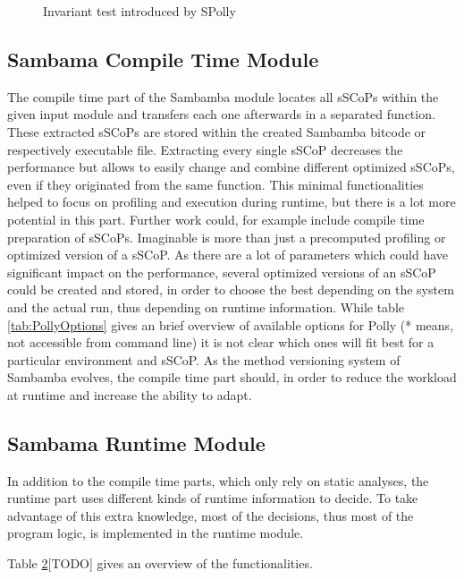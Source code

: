 \lstset{frame=none}
\begin{figure}[htbp]
  \centering
  \subfloat[source]{
  
  \label{lst:InvariantTestSRC}}
  \hspace*{5mm}
  \caption{Invariant test introduced by SPolly}
  \label{lst:InvariantTest}  
\end{figure}
\resetlst



\begin{shaded}
\section{Sambama Compile Time Module}
The compile time part of the Sambamba module locates all sSCoPs
within the given input module and transfers each one afterwards in a separated 
function. These extracted sSCoPs are stored within the created Sambamba 
bitcode or respectively executable file. Extracting every single sSCoP 
decreases the performance but allows to easily change and combine different 
optimized sSCoPs, even if they originated from the same function.   
This minimal functionalities helped to focus on profiling and
execution during runtime, but there is a lot more potential in this part.
Further work could, for example include compile time preparation of sSCoPs.
Imaginable is more than just a precomputed profiling or optimized version of
a sSCoP. As there are a lot of parameters which could have significant impact 
on the performance, several optimized versions of an sSCoP could be created
and stored, in order to choose the best depending on the system and the actual
run, thus depending on runtime information.
While table \ref{tab:PollyOptions} gives an brief
overview of available options for Polly (* means, not accessible from 
command line)
it is not clear which ones will fit best for a particular environment and sSCoP. 
As the method versioning system of Sambamba evolves, the compile time part 
should, in order to reduce the workload at runtime and increase the ability to
adapt. 

\end{shaded}

\red
\begin{shaded}
\section{Sambama Runtime Module}

In addition to the compile time parts, which only rely on static analyses,
the runtime part uses different kinds of runtime information to decide. 
To take advantage of this extra knowledge, most of the decisions, thus most of
the program logic, is implemented in the runtime module. 


Table \ref{}[TODO] gives an overview of the functionalities.

\end{shaded}

